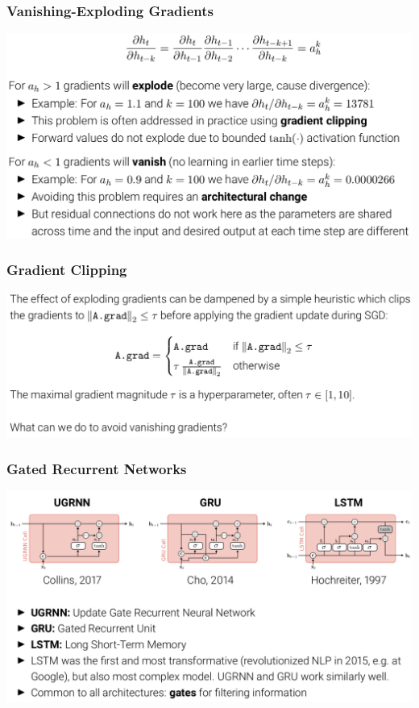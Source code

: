 \documentclass[10pt]{beamer}
\begin{document}
\begin{frame}
  \frametitle{Vanishing-Exploding Gradients}
\begin{center}
\includegraphics[width=.95\textwidth]{images/s15}
\end{center}
\end{frame}


\begin{frame}
  \frametitle{Gradient Clipping}
\begin{center}
\includegraphics[width=.95\textwidth]{images/s16}
\end{center}
\end{frame}

\begin{frame}
  \frametitle{Gated Recurrent Networks}
\begin{center}
\includegraphics[width=.95\textwidth]{images/s17}
\end{center}
\end{frame}
\end{document}
